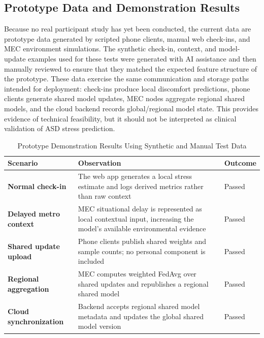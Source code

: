 \documentclass[lettersize,journal]{IEEEtran}
\begin{document}
\subsection{Prototype Data and Demonstration Results}

Because no real participant study has yet been conducted, the current
data are prototype data generated by scripted phone clients, manual web
check-ins, and MEC environment simulations. The synthetic check-in,
context, and model-update examples used for these tests were generated
with AI assistance and then manually reviewed to ensure that they
matched the expected feature structure of the prototype. These data
exercise the same communication and storage paths intended for
deployment: check-ins produce local discomfort predictions, phone
clients generate shared model updates, MEC nodes aggregate regional
shared models, and the cloud backend records global/regional model
state. This provides evidence of technical feasibility, but it should
not be interpreted as clinical validation of ASD stress prediction.

\begin{table}[!t]
    \centering
    \caption{Prototype Demonstration Results Using Synthetic and Manual Test Data\label{tab:demo_results}}
    \scriptsize
    \renewcommand{\arraystretch}{1.2}
    \begin{tabularx}{\columnwidth}{
        >{\raggedright\bfseries}p{2.2cm}
        >{\raggedright}X
        >{\raggedright\arraybackslash}p{1.5cm}}
        \toprule
        \rowcolor{gray!15}
        \textbf{Scenario} & \textbf{Observation} & \textbf{Outcome} \\
        \midrule
        Normal check-in &
        The web app generates a local stress estimate and logs derived
        metrics rather than raw context &
        Passed \\
        \midrule
        Delayed metro context &
        MEC situational delay is represented as local contextual input,
        increasing the model's available environmental evidence &
        Passed \\
        \midrule
        Shared update upload &
        Phone clients publish shared weights and sample counts; no
        personal component is included &
        Passed \\
        \midrule
        Regional aggregation &
        MEC computes weighted FedAvg over shared updates and republishes
        a regional shared model &
        Passed \\
        \midrule
        Cloud synchronization &
        Backend accepts regional shared model metadata and updates the
        global shared model version &
        Passed \\
        \bottomrule
    \end{tabularx}
\end{table}
\end{document}
